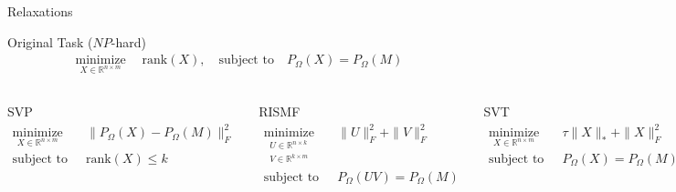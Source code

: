 \documentclass{beamer}
\begin{document}
\begin{frame}{Relaxations}
	\begin{block}{Original Task ($NP$-hard)}
		\vspace{-0.2cm}
		\begin{align*}
		\mathop{\text{minimize}}\limits_{X \in \mathbb{R}^{n \times m}} \quad 
		\text{rank} (X), \quad 
		\text{subject to} \quad P_{\Omega} (X) = P_{\Omega} (M)
		\end{align*}
	\end{block}
	\vspace{0.3cm}
	\footnotesize
	\begin{columns}[c]
	\begin{block}{SVP}
		\vspace{-0.3cm}
		\begin{align*}
		\mathop{\text{minimize}}\limits_{X \in \mathbb{R}^{n \times m}} \quad & 
		\| P_{\Omega} (X) - P_{\Omega} (M) \|_F^2 \\
		\text{subject to} \quad & \text{rank} (X) \leq k
		\end{align*}
	\end{block}
	
	\begin{block}{RISMF}
		\vspace{-0.3cm}
		\begin{align*}
		\mathop{\text{minimize}}\limits_{\substack{	U \in \mathbb{R}^{n \times k} \\ V \in \mathbb{R}^{k \times m}}} \quad & \| U \|^2_F + \| V \|^2_F \\
		\text{subject to} \quad &  P_{\Omega} (UV) = P_{\Omega} (M) 
		\end{align*}
	\end{block}
	\begin{block}{SVT}
		\vspace{-0.3cm}
		\begin{align*}
		\mathop{\text{minimize}}\limits_{X \in \mathbb{R}^{n \times m}} \quad & \tau \| X \|_* + \| X \|_F^2 \\
		\text{subject to} \quad & P_{\Omega} (X) = P_{\Omega} (M)
		\end{align*}
	\end{block}
	\begin{block}{SoftImpute}
		\vspace{-0.3cm}
		\begin{align*}
		\mathop{\text{minimize}}\limits_{X \in \mathbb{R}^{n \times m}} \quad & 
		\| X \|_* \\
		\text{subject to} \quad & \| P_{\Omega} (X) - P_{\Omega} (M) \|_F \leq \delta
		\end{align*}
	\end{block}
\end{columns}
	
\end{frame}
\end{document}
